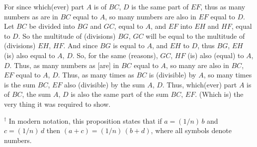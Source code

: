 \begin{Parallel}{}{}
{For since which(ever) part $A$ is of $BC$, $D$ is the same part of $EF$, thus as many
numbers as are in $BC$ equal to $A$, so many numbers are also in 
$EF$ equal to $D$. Let $BC$ be divided into $BG$ and $GC$, equal to $A$, and
$EF$ into $EH$ and $HF$, equal to $D$. So the multitude of (divisions) $BG$,
$GC$ will be equal to the multitude of (divisions) $EH$, $HF$. And
since $BG$ is equal to $A$, and $EH$ to $D$, thus $BG$, $EH$ (is) also equal to $A$, $D$.
So, for the same (reasons), $GC$, $HF$ (is) also (equal) to $A$, $D$. Thus,
as many numbers as [are] in $BC$ equal to $A$, so many are
also in $BC$, $EF$ equal to $A$, $D$. Thus, as many times as $BC$ is (divisible)
by $A$, so many times is the sum $BC$, $EF$ also (divisible)  by the sum $A$, $D$.
Thus, which(ever) part $A$ is of $BC$, the sum $A$, $D$ is also the same
part of the sum $BC$, $EF$. (Which is) the very thing it was required to show.}
\end{Parallel}
{\footnotesize\noindent$^\dag$ In modern notation, this
proposition states that if $a = (1/n)\,b$ and $c = (1/n)\,d$ then $(a+c) = (1/n)\,(b+d)$,
where all symbols denote numbers.}

